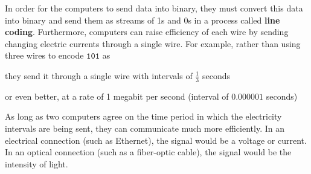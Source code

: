 \documentclass{article}
\begin{document}
  In order for the computers to send data into binary, they must convert this data into binary and send them as streams of 1s and 0s in a process called \textbf{line coding}. Furthermore, computers can raise efficiency of each wire by sending changing electric currents through a single wire. For example, rather than using three wires to encode $\texttt{101}$ as 
  \begin{center}
  \end{center}
  they send it through a single wire with intervals of $\frac{1}{3}$ seconds
  \begin{center}
  \end{center}
  or even better, at a rate of 1 megabit per second (interval of $0.000001$ seconds)
  \begin{center}
  \end{center}

  As long as two computers agree on the time period in which the electricity intervals are being sent, they can communicate much more efficiently. In an electrical connection (such as Ethernet), the signal would be a voltage or current. In an optical connection (such as a fiber-optic cable), the signal would be the intensity of light. 
\end{document}
